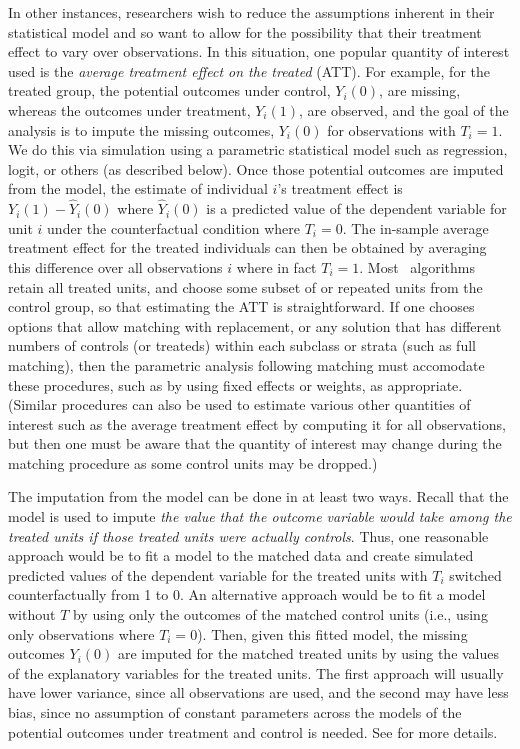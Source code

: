 In other instances, researchers wish to reduce the assumptions
inherent in their statistical model and so want to allow for the
possibility that their treatment effect to vary over observations.  In
this situation, one popular quantity of interest used is the
\emph{average treatment effect on the treated} (ATT).  For example,
for the treated group, the potential outcomes under control, $Y_i(0)$,
are missing, whereas the outcomes under treatment, $Y_i(1)$, are
observed, and the goal of the analysis is to impute the missing
outcomes, $Y_i(0)$ for observations with $T_i=1$.  We do this via
simulation using a parametric statistical model such as regression,
logit, or others (as described below).  Once those potential outcomes
are imputed from the model, the estimate of individual $i$'s treatment
effect is $Y_i(1)-\widehat{Y}_i(0)$ where $\widehat{Y}_i(0)$ is a
predicted value of the dependent variable for unit $i$ under the
counterfactual condition where $T_i=0$.  The in-sample average
treatment effect for the treated individuals can then be obtained by
averaging this difference over all observations $i$ where in fact
$T_i=1$.  Most \MatchIt\ algorithms retain all treated units, and
choose some subset of or repeated units from the control group, so
that estimating the ATT is straightforward.  If one chooses options
that allow matching with replacement, or any solution that has
different numbers of controls (or treateds) within each subclass or strata (such
as full matching), 
then the parametric analysis following matching must accomodate these
procedures, such as by using fixed effects or weights, as appropriate.
(Similar procedures can also be used to estimate various other
quantities of interest such as the average treatment effect by
computing it for all observations, but then one must be aware that the
quantity of interest may change during the matching procedure 
as some control units may be dropped.)

The imputation from the model can be done in at least two ways.
Recall that the model is used to impute \emph{the value that the
  outcome variable would take among the treated units if those treated
  units were actually controls}.  Thus, one reasonable approach would
be to fit a model to the matched data and create simulated predicted
values of the dependent variable for the treated units with $T_i$
switched counterfactually from 1 to 0.  An alternative approach would
be to fit a model without $T$ by using only the outcomes of the
matched control units (i.e., using only observations where $T_i=0$).
Then, given this fitted model, the missing outcomes $Y_i(0)$ are
imputed for the matched treated units by using the values of the
explanatory variables for the treated units.  The first approach will
usually have lower variance, since all observations are used, and the
second may have less bias, since no assumption of constant parameters
across the models of the potential outcomes under treatment and control is needed.  
See \citet*{HoImaKin07} for more details.

